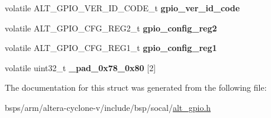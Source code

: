 \begin{DoxyCompactItemize}
volatile A\+L\+T\+\_\+\+G\+P\+I\+O\+\_\+\+V\+E\+R\+\_\+\+I\+D\+\_\+\+C\+O\+D\+E\+\_\+t {\bfseries gpio\+\_\+ver\+\_\+id\+\_\+code}
\item 
\mbox{\label{structALT__GPIO__s_a7c89a61f84e3986ed8a2dce688b01251}} 
volatile A\+L\+T\+\_\+\+G\+P\+I\+O\+\_\+\+C\+F\+G\+\_\+\+R\+E\+G2\+\_\+t {\bfseries gpio\+\_\+config\+\_\+reg2}
\item 
\mbox{\label{structALT__GPIO__s_a1df4e81f675196bc4b973c227c5895de}} 
volatile A\+L\+T\+\_\+\+G\+P\+I\+O\+\_\+\+C\+F\+G\+\_\+\+R\+E\+G1\+\_\+t {\bfseries gpio\+\_\+config\+\_\+reg1}
\item 
\mbox{\label{structALT__GPIO__s_ad874413b2d4b9f094452680921f0b23f}} 
volatile uint32\+\_\+t {\bfseries \+\_\+pad\+\_\+0x78\+\_\+0x80} \mbox{[}2\mbox{]}
\end{DoxyCompactItemize}


The documentation for this struct was generated from the following file\+:\begin{DoxyCompactItemize}
\item 
bsps/arm/altera-\/cyclone-\/v/include/bsp/socal/\mbox{\hyperlink{alt__gpio_8h}{alt\+\_\+gpio.\+h}}\end{DoxyCompactItemize}
